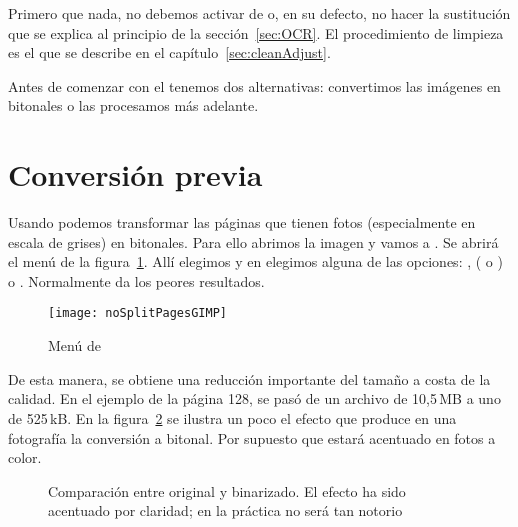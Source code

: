 \documentclass[%
	a5paper,
	10pt,
	twoside,
	openright,
	final,
]{memoir}
\begin{document}
	Primero que nada, no debemos activar  de \scantailor o, en su defecto, no hacer la sustitución que se explica al principio de la sección~\ref{sec:OCR}. El procedimiento de limpieza es el que se describe en el capítulo~\ref{sec:cleanAdjust}.

	Antes de comenzar con el \ocr tenemos dos alternativas: convertimos las imágenes en bitonales o las procesamos más adelante.

	\section{Conversión previa} Usando \gimp podemos transformar las páginas que tienen fotos (especialmente en escala de grises) en bitonales. Para ello abrimos la imagen y vamos a . Se abrirá el menú de la figura~\ref{fig:noSplitPagesGIMP}. Allí elegimos  y en  elegimos alguna de las opciones: ,  ( o ) o . Normalmente  da los peores resultados.

	\begin{figure}
		\centering
		\texttt{[image: noSplitPagesGIMP]}
		\caption[Menú Convert Image to Indexed Colors de \gimp]{Menú  de \gimp\label{fig:noSplitPagesGIMP}}
	\end{figure}

	De esta manera, se obtiene una reducción importante del tamaño a costa de la calidad. En el ejemplo de la página 128, se pasó de un archivo de 10,5\,MB a uno de 525\,kB. En la figura~\ref{fig:SToutputPictureZonesBitonal} se ilustra un poco el efecto que produce en una fotografía la conversión a bitonal. Por supuesto que estará acentuado en fotos a color.

	\begin{figure}
		\caption[Comparación entre original y binarizado.]{Comparación entre original y binarizado. El efecto ha sido acentuado por claridad; en la práctica no será tan notorio\label{fig:SToutputPictureZonesBitonal}}
	\end{figure}
\end{document}
